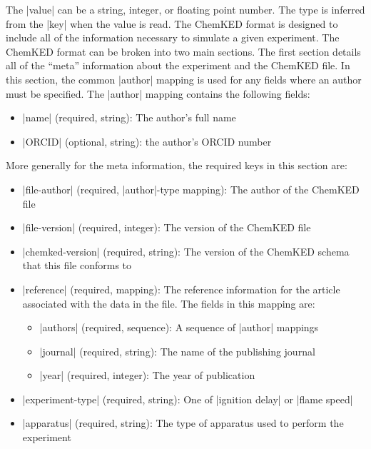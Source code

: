 \documentclass[12pt]{ussci}
\newcommand\ck{ChemKED}
\begin{document}
The \yaml|value| can be a string, integer, or floating point number. The type is
inferred from the \yaml|key| when the value is read. The \ck{} format is
designed to include all of the information necessary to simulate a given
experiment. The \ck{} format can be broken into two main sections. The first
section details all of the ``meta'' information about the experiment and the
\ck{} file. In this section, the common \yaml|author| mapping is used for any
fields where an author must be specified. The \yaml|author| mapping contains the
following fields:
%
\begin{itemize}
    \item \yaml|name| (required, string): The author's full name
    \item \yaml|ORCID| (optional, string): the author's ORCID number
\end{itemize}
%
More generally for the meta information, the required keys in this section
are:
%
\begin{itemize}
    \item \yaml|file-author| (required, \yaml|author|-type mapping): The author
    of the \ck{} file
    \item \yaml|file-version| (required, integer): The version of the \ck{} file
    \item \yaml|chemked-version| (required, string): The version of the \ck{}
    schema that this file conforms to
    \item \yaml|reference| (required, mapping): The reference information for
    the article associated with the data in the file. The fields in this
    mapping are:
    \begin{itemize}
        \item \yaml|authors| (required, sequence): A sequence of \yaml|author| mappings
        \item \yaml|journal| (required, string): The name of the publishing journal
        \item \yaml|year| (required, integer): The year of publication
    \end{itemize}
    \item \yaml|experiment-type| (required, string): One of \yaml|ignition delay| or \yaml|flame speed|
    \item \yaml|apparatus| (required, string): The type of apparatus used to perform the experiment
\end{itemize}
\end{document}
